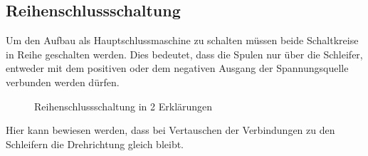 \subsection{Reihenschlussschaltung}

Um den Aufbau als Hauptschlussmaschine zu schalten müssen beide Schaltkreise in Reihe geschalten werden.
Dies bedeutet, dass die Spulen nur über die Schleifer, entweder mit dem positiven oder dem negativen Ausgang der Spannungsquelle verbunden werden dürfen.

\begin{figure}[H]
    \centering
    \hfill
    \hfill
    \hfill
    \caption{Reihenschlussschaltung in 2 Erklärungen}
\end{figure}

Hier kann bewiesen werden, dass bei Vertauschen der Verbindungen zu den Schleifern die Drehrichtung gleich bleibt.